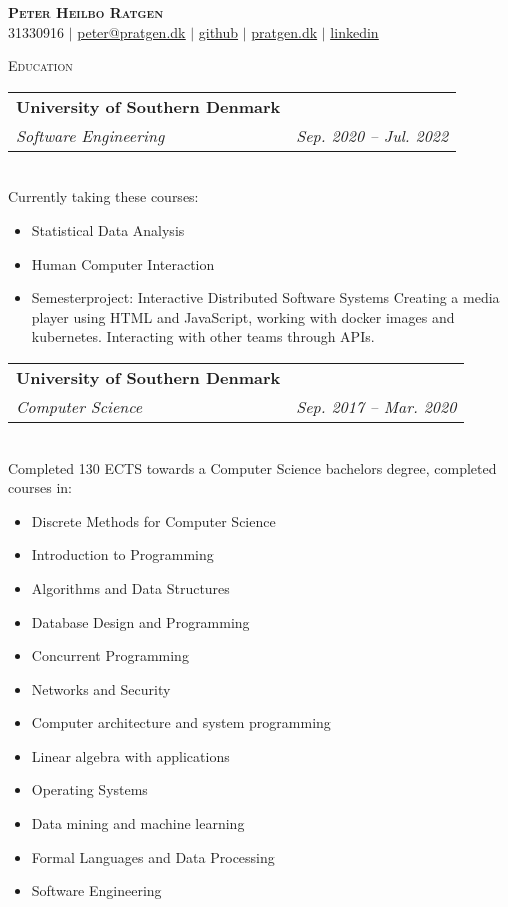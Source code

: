 \documentclass[11pt]{article}
\makeatletter
\newcommand{\resumeSubheading}[4]{
  \noindent\begin{tabular*}{0.98\textwidth}[t]{l@{\extracolsep{\fill}}r}
    \textbf{#1} & #2 \\ \vspace{-3pt} 
    \textit{\small#3} & \textit{\small #4} 
  \end{tabular*}\vspace{7pt}
}
\makeatother
\begin{document}
\begin{center}
  \textbf{\huge{\scshape{Peter Heilbo Ratgen}}}\\ 
  \vspace{0.2cm}
  \small 31330916 $|$
  \href{mailto:peter@pratgen.dk}{\underline{peter@pratgen.dk}} $|$
  \href{https://github.com/PeterRatgen }{\underline{github}} $|$
  \href{https://pratgen.dk}{\underline{pratgen.dk}} $|$
  \href{https://www.linkedin.com/in/peter-ratgen-a1236529/}{\underline{linkedin}}
\end{center}

\noindent\large{\scshape{Education}} \newline
\noindent{\rule[0.3cm]{\textwidth}{0.4pt}}

\resumeSubheading{University of Southern Denmark}{}{Software Engineering}{Sep.
2020 -- Jul. 2022}\\\vspace{0.25cm}
{\indent\small Currently taking these courses:}
  \vspace{-0.3cm}
  {\small 
  \begin{itemize}
  \setlength{\itemsep}{-1pt}
    \item Statistical Data Analysis
    \item Human Computer Interaction
    \item Semesterproject: Interactive Distributed Software Systems
      \subitem Creating a media player using HTML and JavaScript, working with
      docker images and kubernetes. Interacting with other teams through APIs.
\end{itemize}} \vspace{0.3cm}


\resumeSubheading{University of Southern Denmark}{}{Computer Science}{Sep. 2017
-- Mar. 2020}\\\vspace{0.25cm} 
{\indent\small Completed 130 ECTS towards a Computer Science bachelors degree,
completed courses in:}
  \vspace{-0.3cm}
  {\footnotesize 
  \begin{itemize}
  \setlength{\itemsep}{-1pt}
    \item Discrete Methods for Computer Science
    \item Introduction to Programming
    \item Algorithms and Data Structures
    \item Database Design and Programming
    \item Concurrent Programming
    \item Networks and Security
    \item Computer architecture and system programming
    \item Linear algebra with applications
    \item Operating Systems
    \item Data mining and machine learning
    \item Formal Languages and Data Processing
    \item Software Engineering
\end{itemize}}
\vspace{0.3cm}
\end{document}
